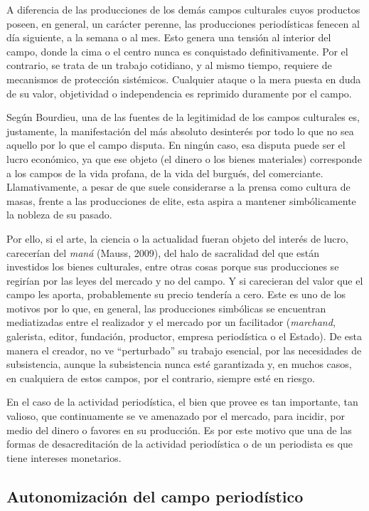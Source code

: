 A diferencia de las producciones de los demás campos culturales cuyos productos poseen, en general, un carácter perenne, las producciones periodísticas fenecen al día siguiente, a la semana o al mes. Esto genera una tensión al interior del campo, donde la cima o el centro nunca es conquistado definitivamente. Por el contrario, se trata de un trabajo cotidiano, y al mismo tiempo, requiere de mecanismos de protección sistémicos. Cualquier ataque o la mera puesta en duda de su valor, objetividad o independencia es reprimido duramente por el campo.

Según Bourdieu, una de las fuentes de la legitimidad de los campos culturales es, justamente, la manifestación del más absoluto desinterés por todo lo que no sea aquello por lo que el campo disputa. En ningún caso, esa disputa puede ser el lucro económico, ya que ese objeto (el dinero o los bienes materiales) corresponde a los campos de la vida profana, de la vida del burgués, del comerciante. Llamativamente, a pesar de que suele considerarse a la prensa como cultura de masas, frente a las producciones de elite, esta aspira a mantener simbólicamente la nobleza de su pasado.

Por ello, si el arte, la ciencia o la actualidad fueran objeto del interés de lucro, carecerían del \emph{maná} (Mauss, 2009), del halo de sacralidad del que están investidos los bienes culturales, entre otras cosas porque sus producciones se regirían por las leyes del mercado y no del campo. Y si carecieran del valor que el campo les aporta, probablemente su precio tendería a cero. Este es uno de los motivos por lo que, en general, las producciones simbólicas se encuentran mediatizadas entre el realizador y el mercado por un facilitador (\emph{marchand}, galerista, editor, fundación, productor, empresa periodística o el Estado). De esta manera el creador, no ve ``perturbado'' su trabajo esencial, por las necesidades de subsistencia, aunque la subsistencia nunca esté garantizada y, en muchos casos, en cualquiera de estos campos, por el contrario, siempre esté en riesgo.

En el caso de la actividad periodística, el bien que provee es tan importante, tan valioso, que continuamente se ve amenazado por el mercado, para incidir, por medio del dinero o favores en su producción. Es por este motivo que una de las formas de desacreditación de la actividad periodística o de un periodista es que tiene intereses monetarios.

\subsection {Autonomización del campo periodístico}


